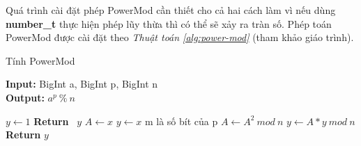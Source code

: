 Quá trình cài đặt phép PowerMod cần thiết cho cả hai cách làm vì nếu dùng \textbf{number\_t} thực hiện phép lũy thừa thì có thể sẽ xảy ra tràn số. 
Phép toán PowerMod được cài đặt theo \textit{Thuật toán \ref{alg:power-mod}} (tham khảo giáo trình).

\begin{algorithm}
\caption{Tính PowerMod}\label{alg:power-mod}
\hspace*{\algorithmicindent} \textbf{Input:} BigInt a, BigInt p, BigInt n\\
\hspace*{\algorithmicindent} \textbf{Output:} $a^p\  \% \ n$ 
\begin{algorithmic}[1]
\State $y \gets 1$
\State \textbf{Return} \ $y$
\EndIf
\State $A \gets x$
\State $y \gets x$
\EndIf
{}\Comment m là số bít của p
\State $A \gets A^2\ mod\ n$
\State $y \gets A*y \ mod \ n$
\EndIf
\EndFor
\State \textbf{Return } $y$
\EndProcedure
\end{algorithmic}
\end{algorithm}